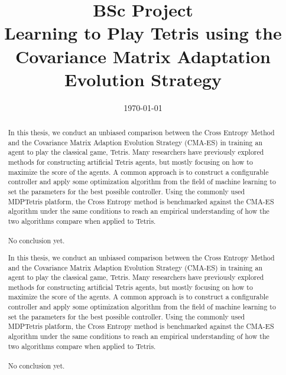 







\title{BSc Project\\\textbf{Learning to Play Tetris using
    the Covariance Matrix Adaptation
    Evolution Strategy}}
\date{\today}
\maketitle

\tableofcontents

\clearpage

\begin{abstract}
In this thesis, we conduct an unbiased comparison between 
the Cross Entropy Method and the Covariance Matrix Adaption
Evolution Strategy (CMA-ES) in training 
an agent to play the classical game, Tetris. Many researchers have 
previously explored methods for constructing artificial Tetris
agents, but mostly focusing on how to maximize the score of the agents.
A common approach is to construct a configurable controller
and apply some optimization algorithm from the field of machine learning
to set the parameters for the best possible controller. Using the 
commonly used MDPTetris \citep{mdptetris} platform, the Cross Entropy
method is benchmarked against the CMA-ES algorithm under the same
conditions to reach an empirical understanding of how the two algorithms
compare when applied to Tetris.\\
\\
No conclusion yet.
\end{abstract}

\begin{abstract}
In this thesis, we conduct an unbiased comparison between 
the Cross Entropy Method and the Covariance Matrix Adaption
Evolution Strategy (CMA-ES) in training 
an agent to play the classical game, Tetris. Many researchers have 
previously explored methods for constructing artificial Tetris
agents, but mostly focusing on how to maximize the score of the agents.
A common approach is to construct a configurable controller
and apply some optimization algorithm from the field of machine learning
to set the parameters for the best possible controller. Using the 
commonly used MDPTetris \citep{mdptetris} platform, the Cross Entropy
method is benchmarked against the CMA-ES algorithm under the same
conditions to reach an empirical understanding of how the two algorithms
compare when applied to Tetris.\\
\\
No conclusion yet.
\end{abstract}



